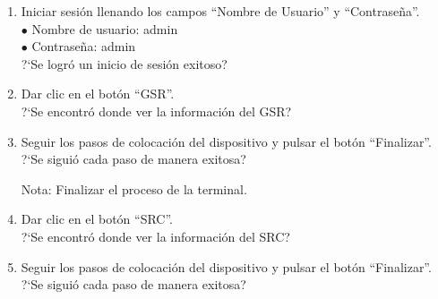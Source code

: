 \begin{enumerate}
	\item {Iniciar sesión llenando los campos ``Nombre de Usuario'' y ``Contraseña''.\\
			$\bullet$ Nombre de usuario: admin\\
			$\bullet$ Contraseña: admin
		\\	
	?`Se logró un inicio de sesión exitoso?
	}
		
	\item {Dar clic en el botón ``GSR''.\\	
	?`Se encontró donde ver la información del GSR?
	}
	\item {Seguir los pasos de colocación del dispositivo y pulsar el botón ``Finalizar''.\\	
	?`Se siguió cada paso de manera exitosa?
	}
	
	Nota: Finalizar el proceso de la terminal.

	\item {Dar clic en el botón ``SRC''.\\	
	?`Se encontró donde ver la información del SRC?
	}
	\item {Seguir los pasos de colocación del dispositivo y pulsar el botón ``Finalizar''.\\	
	?`Se siguió cada paso de manera exitosa?
	}
	

\end{enumerate}
